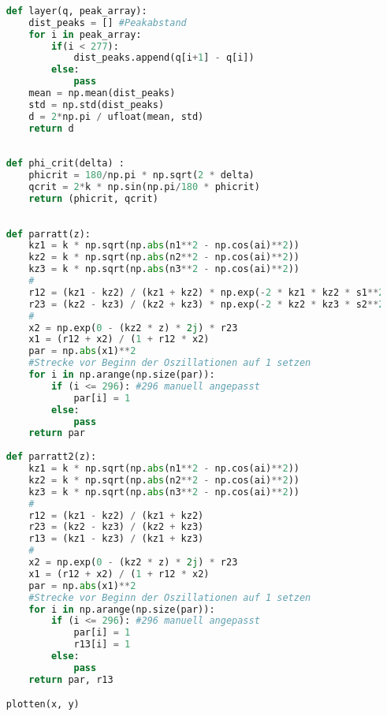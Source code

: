 \begin{lstlisting}[language=Python]
    
    def layer(q, peak_array):
        dist_peaks = [] #Peakabstand
        for i in peak_array:
            if(i < 277):
                dist_peaks.append(q[i+1] - q[i])
            else:
                pass
        mean = np.mean(dist_peaks)
        std = np.std(dist_peaks)
        d = 2*np.pi / ufloat(mean, std)
        return d
    
    
    def phi_crit(delta) :
        phicrit = 180/np.pi * np.sqrt(2 * delta)
        qcrit = 2*k * np.sin(np.pi/180 * phicrit)
        return (phicrit, qcrit)
    
    
    def parratt(z):
        kz1 = k * np.sqrt(np.abs(n1**2 - np.cos(ai)**2))
        kz2 = k * np.sqrt(np.abs(n2**2 - np.cos(ai)**2))
        kz3 = k * np.sqrt(np.abs(n3**2 - np.cos(ai)**2))
        #
        r12 = (kz1 - kz2) / (kz1 + kz2) * np.exp(-2 * kz1 * kz2 * s1**2)
        r23 = (kz2 - kz3) / (kz2 + kz3) * np.exp(-2 * kz2 * kz3 * s2**2)
        #
        x2 = np.exp(0 - (kz2 * z) * 2j) * r23
        x1 = (r12 + x2) / (1 + r12 * x2)
        par = np.abs(x1)**2
        #Strecke vor Beginn der Oszillationen auf 1 setzen
        for i in np.arange(np.size(par)):
            if (i <= 296): #296 manuell angepasst
                par[i] = 1
            else:
                pass
        return par
    
    def parratt2(z):
        kz1 = k * np.sqrt(np.abs(n1**2 - np.cos(ai)**2))
        kz2 = k * np.sqrt(np.abs(n2**2 - np.cos(ai)**2))
        kz3 = k * np.sqrt(np.abs(n3**2 - np.cos(ai)**2))
        #
        r12 = (kz1 - kz2) / (kz1 + kz2)
        r23 = (kz2 - kz3) / (kz2 + kz3)
        r13 = (kz1 - kz3) / (kz1 + kz3)
        #
        x2 = np.exp(0 - (kz2 * z) * 2j) * r23
        x1 = (r12 + x2) / (1 + r12 * x2)
        par = np.abs(x1)**2
        #Strecke vor Beginn der Oszillationen auf 1 setzen
        for i in np.arange(np.size(par)):
            if (i <= 296): #296 manuell angepasst
                par[i] = 1
                r13[i] = 1
            else:
                pass
        return par, r13

    plotten(x, y)
\end{lstlisting}